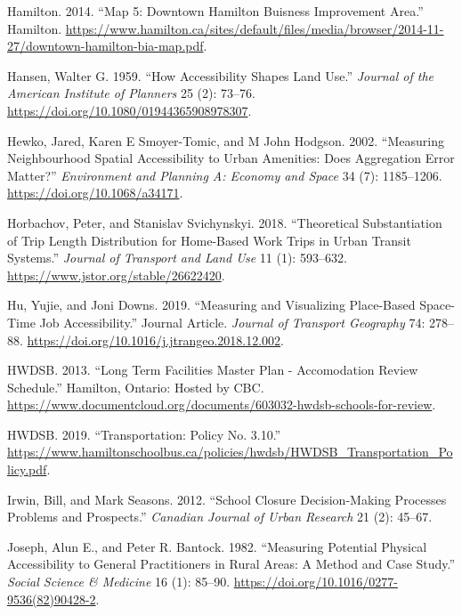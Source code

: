 \documentclass[
default
]{sn-jnl}
\newlength{\cslhangindent}
\newenvironment{CSLReferences}[2] %
 {\begin{list}{}{%
  \setlength{\itemindent}{0pt}
  \setlength{\leftmargin}{0pt}
  \setlength{\parsep}{0pt}
  \ifodd #1
   \setlength{\leftmargin}{\cslhangindent}
   \setlength{\itemindent}{-1\cslhangindent}
  \fi
  \setlength{\itemsep}{#2\baselineskip}}}
 {\end{list}}
\begin{document}
\begin{CSLReferences}{1}{0}
Hamilton. 2014. {``Map 5: Downtown Hamilton Buisness Improvement
Area.''} Hamilton.
\url{https://www.hamilton.ca/sites/default/files/media/browser/2014-11-27/downtown-hamilton-bia-map.pdf}.

Hansen, Walter G. 1959. {``How {Accessibility Shapes Land Use}.''}
\emph{Journal of the American Institute of Planners} 25 (2): 73--76.
\url{https://doi.org/10.1080/01944365908978307}.

Hewko, Jared, Karen E Smoyer-Tomic, and M John Hodgson. 2002.
{``Measuring Neighbourhood Spatial Accessibility to Urban Amenities:
Does Aggregation Error Matter?''} \emph{Environment and Planning A:
Economy and Space} 34 (7): 1185--1206.
\url{https://doi.org/10.1068/a34171}.

Horbachov, Peter, and Stanislav Svichynskyi. 2018. {``Theoretical
Substantiation of Trip Length Distribution for Home-Based Work Trips in
Urban Transit Systems.''} \emph{Journal of Transport and Land Use} 11
(1): 593--632. \url{https://www.jstor.org/stable/26622420}.

Hu, Yujie, and Joni Downs. 2019. {``Measuring and Visualizing
Place-Based Space-Time Job Accessibility.''} Journal Article.
\emph{Journal of Transport Geography} 74: 278--88.
\url{https://doi.org/10.1016/j.jtrangeo.2018.12.002}.

HWDSB. 2013. {``Long Term Facilities Master Plan - Accomodation Review
Schedule.''} Hamilton, Ontario: Hosted by {CBC}.
\url{https://www.documentcloud.org/documents/603032-hwdsb-schools-for-review}.

HWDSB. 2019. {``Transportation: Policy No. 3.10.''}
\url{https://www.hamiltonschoolbus.ca/policies/hwdsb/HWDSB_Transportation_Policy.pdf}.

Irwin, Bill, and Mark Seasons. 2012. {``School {Closure Decision-Making
Processes Problems} and {Prospects}.''} \emph{Canadian Journal of Urban
Research} 21 (2): 45--67.

Joseph, Alun E., and Peter R. Bantock. 1982. {``Measuring Potential
Physical Accessibility to General Practitioners in Rural Areas: A Method
and Case Study.''} \emph{Social Science \& Medicine} 16 (1): 85--90.
\url{https://doi.org/10.1016/0277-9536(82)90428-2}.


\end{CSLReferences}
\end{document}
